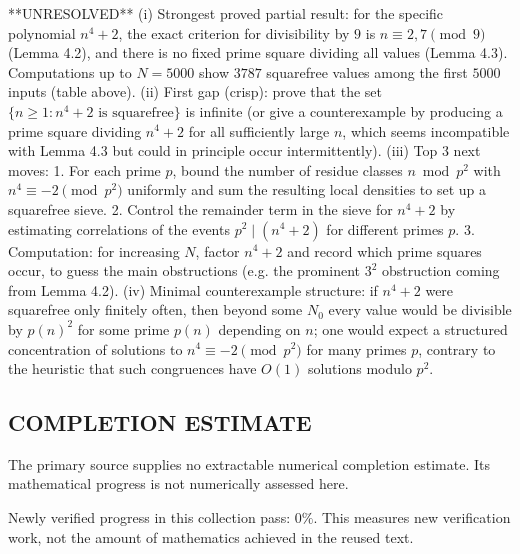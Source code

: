 **UNRESOLVED**
(i) Strongest proved partial result: for the specific polynomial $n^4+2$, the exact criterion for divisibility by $9$ is $n\equiv 2,7\pmod 9$ (Lemma 4.2), and there is no fixed prime square dividing all values (Lemma 4.3). Computations up to $N=5000$ show $3787$ squarefree values among the first $5000$ inputs (table above).
(ii) First gap (crisp): prove that the set $\{n\ge 1: n^4+2\text{ is squarefree}\}$ is infinite (or give a counterexample by producing a prime square dividing $n^4+2$ for all sufficiently large $n$, which seems incompatible with Lemma 4.3 but could in principle occur intermittently).
(iii) Top 3 next moves:
  1. For each prime $p$, bound the number of residue classes $n\bmod p^2$ with $n^4\equiv -2\pmod{p^2}$ uniformly and sum the resulting local densities to set up a squarefree sieve.
  2. Control the remainder term in the sieve for $n^4+2$ by estimating correlations of the events $p^2\mid(n^4+2)$ for different primes $p$.
  3. Computation: for increasing $N$, factor $n^4+2$ and record which prime squares occur, to guess the main obstructions (e.g. the prominent $3^2$ obstruction coming from Lemma 4.2).
(iv) Minimal counterexample structure: if $n^4+2$ were squarefree only finitely often, then beyond some $N_0$ every value would be divisible by $p(n)^2$ for some prime $p(n)$ depending on $n$; one would expect a structured concentration of solutions to $n^4\equiv -2\pmod{p^2}$ for many primes $p$, contrary to the heuristic that such congruences have $O(1)$ solutions modulo $p^2$.




\subsection*{COMPLETION ESTIMATE}
The primary source supplies no extractable numerical completion estimate. Its mathematical progress is not numerically assessed here.

Newly verified progress in this collection pass: $0\%$. This measures new verification work, not the amount of mathematics achieved in the reused text.
